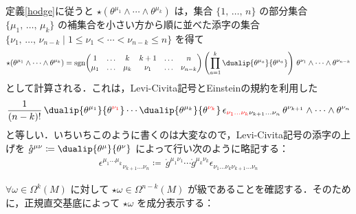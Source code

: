\documentclass[geometry_main]{subfiles}
\begin{document}
\begin{marker}	 
	定義\ref{hodge}に従うと $\star(\theta^{\mu_1} \wedge \cdots \wedge \theta^{\mu_k})$ は，集合 $\{1,\, \dots ,\, n\}$ の部分集合 $\{ \mu_1,\, \dots ,\, \mu_k \}$ の補集合を小さい方から順に並べた添字の集合 $\{ \nu_1,\, \dots ,\, \nu_{n-k} \mid 1 \le \nu_1 < \cdots < \nu_{n-k} \le n\} $ を得て
	\begin{align} 
		\star(\theta^{\mu_1} \wedge \cdots \wedge \theta^{\mu_k}) = \mathrm{sgn} \mqty(1 & \dots & k & k+1 & \dots & n \\ \mu_1 & \dots & \mu_k & \nu_1 & \dots & \nu_{n-k}) \left(\prod_{a=1}^k \dualip{\theta^{\mu_a}}{\theta^{\mu_a}}\right)\, \theta^{\nu_1} \wedge \cdots \wedge \theta^{\nu_{n-k}}
	\end{align}
	として計算される．これは，Levi-Civita記号とEinsteinの規約を利用した
	\begin{align} 
		\frac{1}{(n-k)!}\, \dualip{\theta^{\mu_1}}{\theta^{\textcolor{red}{\nu_1}}} \cdots \dualip{\theta^{\mu_k}}{\theta^{\textcolor{red}{\nu_k}}}\, \epsilon_{\textcolor{red}{\nu_1 \dots \nu_k}\nu_{k+1} \dots \nu_{n}}\, \theta^{\nu_{k+1}} \wedge \cdots \wedge \theta^{\nu_{n}}
	\end{align}
	と等しい．いちいちこのように書くのは大変なので，Levi-Civita記号の添字の上げを $\mathring{g}^{\mu\nu} \coloneqq \dualip{\theta^\mu}{\theta^\nu}$ によって行い次のように略記する：
	\begin{align} 
		\epsilon^{\mu_1 \dots \mu_k}{}_{\nu_{k+1} \dots \nu_{n}} \coloneqq \, \mathring{g}^{\mu_1\nu_1} \cdots \mathring{g}^{\mu_k\nu_k}\epsilon_{\nu_1 \dots \nu_k\nu_{k+1} \dots \nu_{n}}
	\end{align}
\end{marker}	

$\forall \omega \in \Omega^k(M)$ に対して $\star \omega \in \Omega^{n-k}(M)$ が\cinfty 級であることを確認する．そのために，正規直交基底によって $\star \omega$ を成分表示する：
\end{document}
